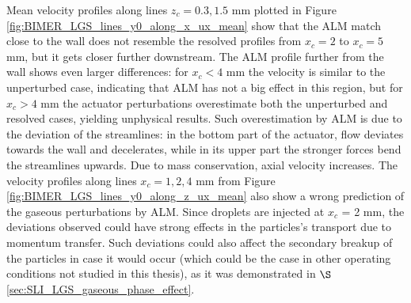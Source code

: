  Mean velocity profiles along lines $z_c = 0.3, 1.5$ mm plotted in Figure \ref{fig:BIMER_LGS_lines_y0_along_x_ux_mean} show that the ALM match close to the wall does not resemble the resolved profiles from $x_c = 2$ to  $x_c = 5$ mm, but it gets closer further downstream. The ALM profile further from the wall shows even larger differences: for $x_c < 4$ mm the velocity is similar to the unperturbed case, indicating that ALM has not a big effect in this region, but for $x_c > 4$ mm the actuator perturbations overestimate both the unperturbed and resolved cases, yielding unphysical results. Such overestimation by ALM is due to the deviation of the streamlines: in the bottom part of the actuator, flow deviates towards the wall and decelerates, while in its upper part the stronger forces bend the streamlines upwards. Due to mass conservation, axial velocity increases. The velocity profiles along lines $x_c = 1, 2, 4$ mm from Figure \ref{fig:BIMER_LGS_lines_y0_along_z_ux_mean} also show a wrong prediction of the gaseous perturbations by ALM. Since droplets are injected at $x_c$ = 2 mm, the deviations observed could have strong effects in the particles's transport due to momentum transfer. Such deviations could also affect the secondary breakup of the particles in case it would occur (which could be the case in other operating conditions not studied in this thesis), as it was demonstrated in $\S$\ref{sec:SLI_LGS_gaseous_phase_effect}.
 

